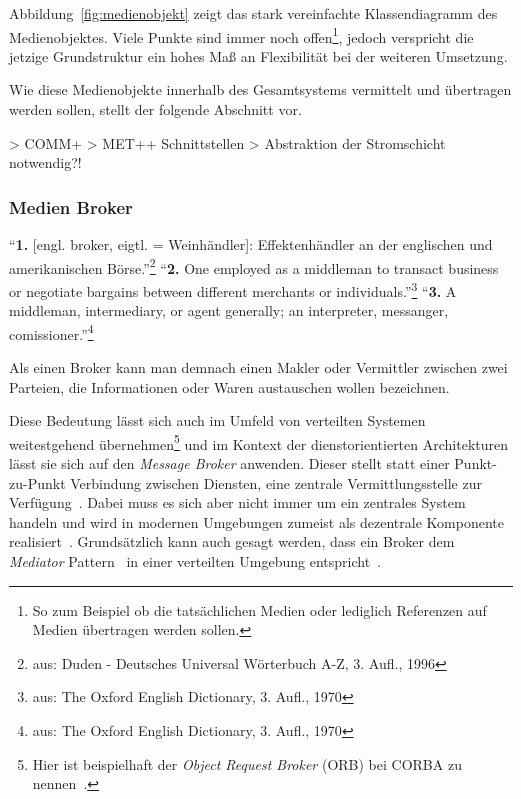    Abbildung~\ref{fig:medienobjekt} zeigt das stark vereinfachte Klassendiagramm des Medienobjektes. Viele Punkte sind immer noch offen\footnote{So zum Beispiel ob die tatsächlichen Medien oder lediglich Referenzen auf Medien übertragen werden sollen.}, jedoch verspricht die jetzige Grundstruktur ein hohes Maß an Flexibilität bei der weiteren Umsetzung.
  
  Wie diese Medienobjekte innerhalb des Gesamtsystems vermittelt und übertragen werden sollen, stellt der folgende Abschnitt vor.
  
  > COMM+
  > MET++ Schnittstellen
  > Abstraktion der Stromschicht notwendig?!


\subsubsection{Medien Broker} %
\label{ssub:media_broker}

  \begin{definition}[Broker]\label{def:broker}
    "`\textbf{1.} [engl. broker, eigtl. = Weinhändler]: Effektenhändler an der englischen und amerikanischen Börse."'\footnote{aus: Duden - Deutsches Universal Wörterbuch A-Z, 3. Aufl., 1996} "`\textbf{2.} One employed as a middleman to transact business or negotiate bargains between different merchants or individuals."'\footnote{aus: The Oxford English Dictionary, 3. Aufl., 1970} "`\textbf{3.} A middleman, intermediary, or agent generally; an interpreter, messanger, comissioner."'\footnote{aus: The Oxford English Dictionary, 3. Aufl., 1970}
  \end{definition}

  Als einen Broker kann man demnach einen Makler oder Vermittler zwischen zwei Parteien, die Informationen oder Waren austauschen wollen bezeichnen.

  Diese Bedeutung lässt sich auch im Umfeld von verteilten Systemen weitestgehend übernehmen\footnote{Hier ist beispielhaft der \emph{Object Request Broker} (ORB) bei CORBA zu nennen~\citep{coulouris2001ds,balzert1999lo}.} und im Kontext der dienstorientierten Architekturen lässt sie sich auf den \emph{Message Broker} anwenden. Dieser stellt statt einer Punkt-zu-Punkt Verbindung zwischen Diensten, eine zentrale Vermittlungsstelle zur Verfügung~\citep[S. 71]{web_services}. Dabei muss es sich aber nicht immer um ein zentrales System handeln und wird in modernen Umgebungen zumeist als dezentrale Komponente realisiert~\citep{enterprise_service_bus}. Grundsätzlich kann auch gesagt werden, dass ein Broker dem \emph{Mediator} Pattern~\citep[S. 273]{design_patterns} in einer verteilten Umgebung entspricht~\citep[S. 83]{enterprise_integration_patterns}.
  

